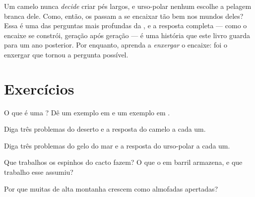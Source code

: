 \begin{remark}\label{rem:g4:adapted-to-their-world:how}
Um camelo nunca \emph{decide} criar pés largos, e urso-polar nenhum
escolhe a pelagem branca dele. Como, então, os  passam a
se encaixar tão bem nos mundos deles? Essa é uma das perguntas mais
profundas da , e a resposta completa --- como o encaixe se
constrói, geração após geração --- é uma história que este livro
guarda para um ano posterior. Por enquanto, aprenda a \emph{enxergar}
o encaixe: foi o enxergar que tornou a pergunta possível.
\end{remark}

\section{Exercícios}

\begin{exercise}[$\star$]\label{exo:g4:adapted-to-their-world:1}
O que é uma ? Dê um exemplo em  e um exemplo em
.
\end{exercise}

\begin{exercise}[$\star$]\label{exo:g4:adapted-to-their-world:2}
Diga três problemas do deserto e a resposta do camelo a cada um.
\end{exercise}

\begin{exercise}[$\star$]\label{exo:g4:adapted-to-their-world:3}
Diga três problemas do gelo do mar e a resposta do urso-polar a cada
um.
\end{exercise}

\begin{exercise}[$\star$]\label{exo:g4:adapted-to-their-world:4}
Que trabalhos os espinhos do cacto fazem? O que o  em barril
armazena, e que trabalho esse  assumiu?
\end{exercise}

\begin{exercise}[$\star$]\label{exo:g4:adapted-to-their-world:5}
Por que muitas  de alta montanha crescem como almofadas
apertadas?
\end{exercise}

